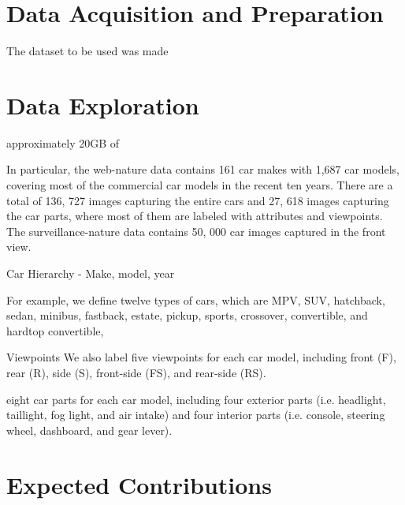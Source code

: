 \documentclass[sigplan,nonacm]{acmart}
\begin{document}
\section{Data Acquisition and Preparation}

The dataset to be used was made 

\section{Data Exploration}

approximately 20GB of

In particular, the web-nature data contains 161 car makes with 1,687 car models, covering most of the commercial car models in the recent ten years. There are a total of 136, 727 images capturing the entire cars and 27, 618 images capturing the car parts, where most of them are labeled with attributes and viewpoints. The surveillance-nature data contains 50, 000 car images captured in the front view.

Car Hierarchy - Make, model, year

For example, we define twelve types of cars, which are MPV, SUV, hatchback, sedan, minibus, fastback, estate, pickup, sports, crossover, convertible, and hardtop convertible,

Viewpoints We also label five viewpoints for each car model, including front (F), rear (R), side (S), front-side (FS), and rear-side (RS).

eight car parts for each car model, including four exterior parts (i.e. headlight, taillight, fog light, and air intake) and four interior parts (i.e. console, steering wheel, dashboard, and gear lever).

\section{Expected Contributions}


\end{document}
